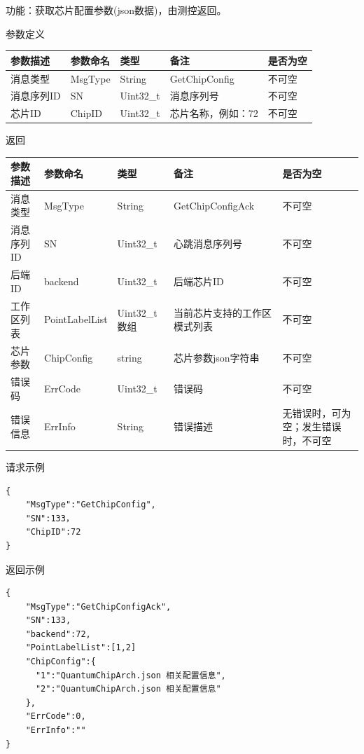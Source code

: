 \documentclass{ctexart}
\begin{document}
功能：获取芯片配置参数(json数据)，由测控返回。

参数定义

\begin{longtable}{|l|l|l|l|l|}
\hline
\textbf{\textbf{参数描述}} & \textbf{\textbf{参数命名}} & \textbf{\textbf{类型}} & \textbf{\textbf{备注}} & \textbf{\textbf{是否为空}} \\
\hline
消息类型 & MsgType & String & GetChipConfig & 不可空 \\
消息序列ID & SN & Uint32_t & 消息序列号 & 不可空 \\
芯片ID & ChipID & Uint32_t & 芯片名称，例如：72 & 不可空 \\
\hline
\end{longtable}

返回

\begin{longtable}{|l|l|l|l|l|}
\hline
\textbf{\textbf{参数描述}} & \textbf{\textbf{参数命名}} & \textbf{\textbf{类型}} & \textbf{\textbf{备注}} & \textbf{\textbf{是否为空}} \\
\hline
消息类型 & MsgType & String & GetChipConfigAck & 不可空 \\
消息序列ID & SN & Uint32_t & 心跳消息序列号 & 不可空 \\
后端ID & backend & Uint32_t & 后端芯片ID & 不可空 \\
工作区列表 & PointLabelList & Uint32_t数组 & 当前芯片支持的工作区模式列表 & 不可空 \\
芯片参数 & ChipConfig & string & 芯片参数json字符串 & 不可空 \\
错误码 & ErrCode & Uint32_t & 错误码 & 不可空 \\
错误信息 & ErrInfo & String & 错误描述 & 无错误时，可为空；发生错误时，不可空 \\
\hline
\end{longtable}

请求示例

\begin{verbatim}{
    "MsgType":"GetChipConfig",
    "SN":133，
    "ChipID":72
}\end{verbatim}

返回示例

\begin{verbatim}{
    "MsgType":"GetChipConfigAck",
    "SN":133,
    "backend":72,
    "PointLabelList":[1,2]
    "ChipConfig":{
      "1":"QuantumChipArch.json 相关配置信息",
      "2":"QuantumChipArch.json 相关配置信息"
    },
    "ErrCode":0,
    "ErrInfo":""
}\end{verbatim}
\end{document}
